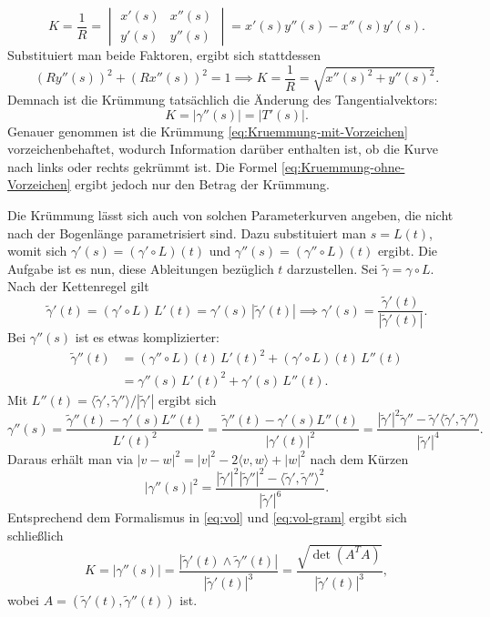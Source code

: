 \begin{equation}\label{eq:Kruemmung-mit-Vorzeichen}
K = \frac{1}{R} =
\begin{vmatrix}
x'(s) & x''(s)\\
y'(s) & y''(s)
\end{vmatrix}
= x'(s)y''(s)-x''(s)y'(s).
\end{equation}
Substituiert man beide Faktoren, ergibt sich stattdessen
\begin{equation}
(Ry''(s))^2+(Rx''(s))^2 = 1
\implies K = \frac{1}{R} = \sqrt{x''(s)^2+y''(s)^2}.
\end{equation}
Demnach ist die Krümmung tatsächlich die Änderung des
Tangentialvektors:
\begin{equation}\label{eq:Kruemmung-ohne-Vorzeichen}
K = |\gamma''(s)| = |T'(s)|.
\end{equation}
Genauer genommen ist die Krümmung \eqref{eq:Kruemmung-mit-Vorzeichen}
vorzeichenbehaftet, wodurch Information darüber enthalten ist, ob
die Kurve nach links oder rechts gekrümmt ist. Die Formel
\eqref{eq:Kruemmung-ohne-Vorzeichen} ergibt jedoch nur den Betrag
der Krümmung.

Die Krümmung lässt sich auch von solchen Parameterkurven angeben,
die nicht nach der Bogenlänge parametrisiert sind. Dazu substituiert
man $s=L(t)$, womit sich $\gamma'(s) = (\gamma'\circ L)(t)$ und
$\gamma''(s)=(\gamma''\circ L)(t)$ ergibt. Die Aufgabe ist es nun, diese
Ableitungen bezüglich $t$ darzustellen. Sei $\tilde\gamma = \gamma\circ L$.
Nach der Kettenregel gilt%
\begin{equation}
\tilde\gamma'(t) = (\gamma'\circ L)\,L'(t) = \gamma'(s)\,|\tilde\gamma'(t)|
\implies \gamma'(s) = \frac{\tilde\gamma'(t)}{|\tilde\gamma'(t)|}.
\end{equation}
Bei $\gamma''(s)$ ist es etwas komplizierter:
\begin{align}
\tilde\gamma''(t)
&= (\gamma''{\circ}L)(t)\,L'(t)^2+(\gamma'{\circ}L)(t)\,L''(t)\\
&= \gamma''(s)\,L'(t)^2+\gamma'(s)\,L''(t).
\end{align}
Mit $L''(t)=\langle\tilde\gamma',\tilde\gamma''\rangle/|\tilde\gamma'|$
ergibt sich
\begin{equation}
\gamma''(s) = \frac{\tilde\gamma''(t)-\gamma'(s)L''(t)}{L'(t)^2}
= \frac{\tilde\gamma''(t)-\gamma'(s)L''(t)}{|\gamma'(t)|^2}
= \frac{
|\tilde\gamma'|^2\tilde\gamma''
-\tilde\gamma'\langle\tilde\gamma',\tilde\gamma''\rangle
}{|\tilde\gamma'|^4}.
\end{equation}
Daraus erhält man via $|v-w|^2 = |v|^2-2\langle v,w\rangle+|w|^2$ nach
dem Kürzen
\begin{equation}
|\gamma''(s)|^2 = \frac{
|\tilde\gamma'|^2|\tilde\gamma''|^2
-\langle\tilde\gamma',\tilde\gamma''\rangle^2
}{|\tilde\gamma'|^6}.
\end{equation}
Entsprechend dem Formalismus in \eqref{eq:vol} und \eqref{eq:vol-gram}
ergibt sich schließlich
\begin{equation}\label{eq:Kruemmung-t}
K = |\gamma''(s)| = \frac{|\tilde\gamma'(t)\wedge\tilde\gamma''(t)|}{|\tilde\gamma'(t)|^3}
= \frac{\sqrt{\det(A^T A)}}{|\tilde\gamma'(t)|^3},
\end{equation}
wobei $A=(\tilde\gamma'(t),\tilde\gamma''(t))$ ist.

